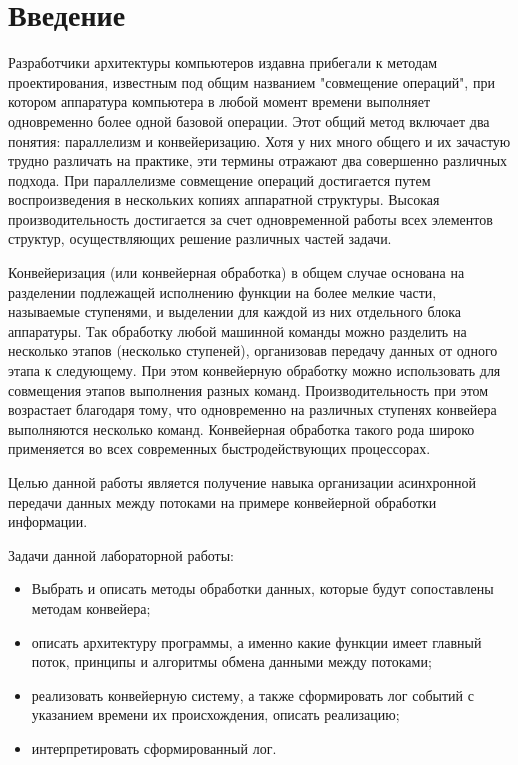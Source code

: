 \chapter*{Введение}
Разработчики архитектуры компьютеров издавна прибегали к методам проектирования, известным под общим названием "совмещение операций", при котором аппаратура компьютера в любой момент времени выполняет одновременно более одной базовой операции. Этот общий метод включает два понятия: параллелизм и конвейеризацию. Хотя у них много общего и их зачастую трудно различать на практике, эти термины отражают два совершенно различных подхода. При параллелизме совмещение операций достигается путем воспроизведения в нескольких копиях аппаратной структуры. Высокая производительность достигается за счет одновременной работы всех элементов структур, осуществляющих решение различных частей задачи.

Конвейеризация (или конвейерная обработка) в общем случае основана на разделении подлежащей исполнению функции на более мелкие части, называемые ступенями, и выделении для каждой из них отдельного блока аппаратуры. Так обработку любой машинной команды можно разделить на несколько этапов (несколько ступеней), организовав передачу данных от одного этапа к следующему. При этом конвейерную обработку можно использовать для совмещения этапов выполнения разных команд. Производительность при этом возрастает благодаря тому, что одновременно на различных ступенях конвейера выполняются несколько команд. Конвейерная обработка такого рода широко применяется во всех современных быстродействующих процессорах.

Целью данной работы является получение навыка организации асинхронной передачи данных между потоками на примере конвейерной обработки информации.

Задачи данной лабораторной работы:
\begin{itemize}
	\item Выбрать и описать методы обработки данных, которые будут сопоставлены методам конвейера;
	\item описать архитектуру программы, а именно какие функции имеет главный поток, принципы и алгоритмы обмена данными между потоками;
	\item реализовать конвейерную систему, а также сформировать лог событий с указанием времени их происхождения, описать реализацию;
	\item интерпретировать сформированный лог.
\end{itemize}